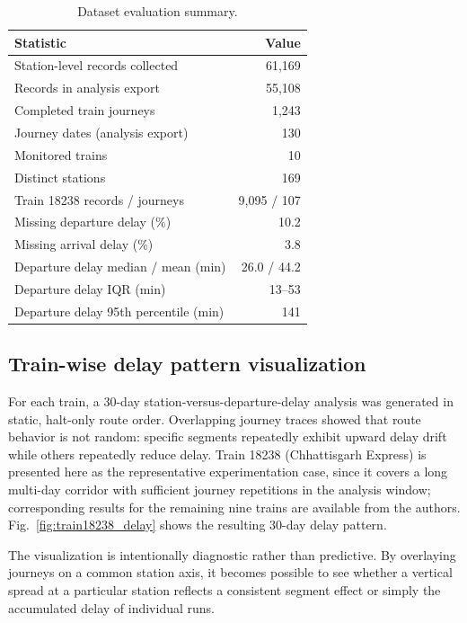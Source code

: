 \documentclass[a4paper,fleqn]{cas-dc}
\begin{document}
\begin{table}[width=\columnwidth,cols=2,pos=h]
\caption{Dataset evaluation summary.}
\label{tab:dataset_stats}
\begin{tabular*}{\tblwidth}{@{\extracolsep{\fill}}l r@{}}
\toprule
Statistic & Value \\
\midrule
Station-level records collected        & 61{,}169 \\
Records in analysis export            & 55{,}108 \\
Completed train journeys              & 1{,}243 \\
Journey dates (analysis export)       & 130 \\
Monitored trains                      & 10 \\
Distinct stations                     & 169 \\
Train 18238 records / journeys        & 9{,}095 / 107 \\
Missing departure delay (\%)          & 10.2 \\
Missing arrival delay (\%)            & 3.8 \\
Departure delay median / mean (min)   & 26.0 / 44.2 \\
Departure delay IQR (min)              & 13--53 \\
Departure delay 95th percentile (min) & 141 \\
\bottomrule
\end{tabular*}
\end{table}

\subsection{Train-wise delay pattern visualization}
For each train, a 30-day station-versus-departure-delay analysis was generated
in static, halt-only route order. Overlapping journey traces showed that route
behavior is not random: specific segments repeatedly exhibit upward delay drift
while others repeatedly reduce delay. Train 18238 (Chhattisgarh Express) is
presented here as the representative experimentation case, since it covers a
long multi-day corridor with sufficient journey repetitions in the analysis
window; corresponding results for the remaining nine trains are available from
the authors. Fig.~\ref{fig:train18238_delay} shows the resulting 30-day delay
pattern.

The visualization is intentionally diagnostic rather than predictive. By
overlaying journeys on a common station axis, it becomes possible to see
whether a vertical spread at a particular station reflects a consistent
segment effect or simply the accumulated delay of individual runs.
\end{document}
